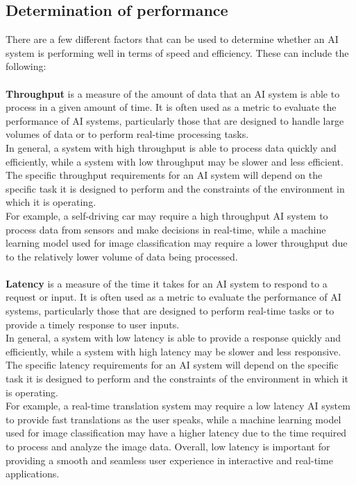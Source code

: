 \subsection{Determination of performance}
There are a few different factors that can be used to determine
whether an AI system is performing well in terms of speed and efficiency.
These can include the following:
\\
\\
\textbf{Throughput} is a measure of the amount of data that an AI system is able to process in a given amount of time.
It is often used as a metric to evaluate the performance of AI systems, particularly those that are designed
to handle large volumes of data or to perform real-time processing tasks.
\\
In general, a system with high throughput is able to process data quickly and efficiently,
while a system with low throughput may be slower and less efficient. The specific throughput
requirements for an AI system will depend on the specific task it is designed to perform and the
constraints of the environment in which it is operating.
\\
For example, a self-driving car may require a high throughput AI system to process data from sensors
and make decisions in real-time, while a machine learning model used for image classification may require a 
lower throughput due to the relatively lower volume of data being processed.
\\
\\
\textbf{Latency} is a measure of the time it takes for an AI system to respond to a request or input.
It is often used as a metric to evaluate the performance of AI systems, particularly those that 
are designed to perform real-time tasks or to provide a timely response to user inputs.
\\
In general, a system with low latency is able to provide a response quickly and efficiently, 
while a system with high latency may be slower and less responsive. The specific latency requirements 
for an AI system will depend on the specific task it is designed to perform and the constraints of the 
environment in which it is operating.
\\
For example, a real-time translation system may require a low latency AI system to provide fast 
translations as the user speaks, while a machine learning model used for image classification may 
have a higher latency due to the time required to process and analyze the image data. Overall, low 
latency is important for providing a smooth and seamless user experience in interactive and real-time applications.
